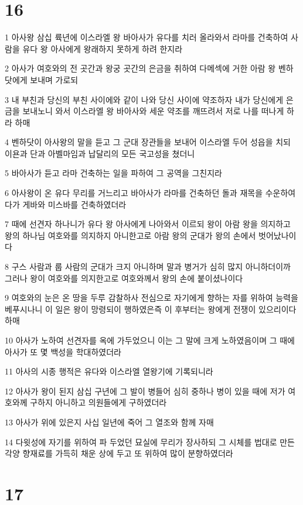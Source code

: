 \chapter{16}

\par 1 아사왕 삼십 륙년에 이스라엘 왕 바아사가 유다를 치러 올라와서 라마를 건축하여 사람을 유다 왕 아사에게 왕래하지 못하게 하려 한지라
\par 2 아사가 여호와의 전 곳간과 왕궁 곳간의 은금을 취하여 다메섹에 거한 아람 왕 벤하닷에게 보내며 가로되
\par 3 내 부친과 당신의 부친 사이에와 같이 나와 당신 사이에 약조하자 내가 당신에게 은금을 보내노니 와서 이스라엘 왕 바아사와 세운 약조를 깨뜨려서 저로 나를 떠나게 하라 하매
\par 4 벤하닷이 아사왕의 말을 듣고 그 군대 장관들을 보내어 이스라엘 두어 성읍을 치되 이욘과 단과 아벨마임과 납달리의 모든 국고성을 쳤더니
\par 5 바아사가 듣고 라마 건축하는 일을 파하여 그 공역을 그친지라
\par 6 아사왕이 온 유다 무리를 거느리고 바아사가 라마를 건축하던 돌과 재목을 수운하여다가 게바와 미스바를 건축하였더라
\par 7 때에 선견자 하나니가 유다 왕 아사에게 나아와서 이르되 왕이 아람 왕을 의지하고 왕의 하나님 여호와를 의지하지 아니한고로 아람 왕의 군대가 왕의 손에서 벗어났나이다
\par 8 구스 사람과 룹 사람의 군대가 크지 아니하며 말과 병거가 심히 많지 아니하더이까 그러나 왕이 여호와를 의지한고로 여호와께서 왕의 손에 붙이셨나이다
\par 9 여호와의 눈은 온 땅을 두루 감찰하사 전심으로 자기에게 향하는 자를 위하여 능력을 베푸시나니 이 일은 왕이 망령되이 행하였은즉 이 후부터는 왕에게 전쟁이 있으리이다 하매
\par 10 아사가 노하여 선견자를 옥에 가두었으니 이는 그 말에 크게 노하였음이며 그 때에 아사가 또 몇 백성을 학대하였더라
\par 11 아사의 시종 행적은 유다와 이스라엘 열왕기에 기록되니라
\par 12 아사가 왕이 된지 삼십 구년에 그 발이 병들어 심히 중하나 병이 있을 때에 저가 여호와께 구하지 아니하고 의원들에게 구하였더라
\par 13 아사가 위에 있은지 사십 일년에 죽어 그 열조와 함께 자매
\par 14 다윗성에 자기를 위하여 파 두었던 묘실에 무리가 장사하되 그 시체를 법대로 만든 각양 향재료를 가득히 채운 상에 두고 또 위하여 많이 분향하였더라

\chapter{17}

